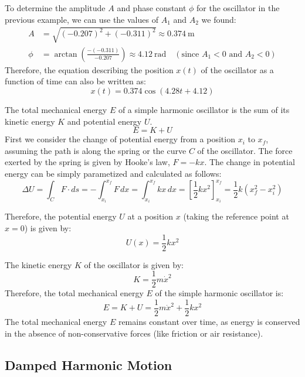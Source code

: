 \documentclass[11pt]{report}
\begin{document}
\begin{example}
    To determine the amplitude \(A\) and phase constant \(\phi\) for the oscillator in the previous example, we can use the values of \(A_1\) and \(A_2\) we found:
    \begin{align*}
        A &= \sqrt{(-0.207)^2 + (-0.311)^2} \approx 0.374\ \mathrm{m} \\
        \phi &= \arctan\!\left(\frac{-(-0.311)}{-0.207}\right) \approx 4.12\ \mathrm{rad} \quad (\text{since } A_1 < 0 \text{ and } A_2 < 0)
    \end{align*}
    Therefore, the equation describing the position \(x(t)\) of the oscillator as a function of time can also be written as:
    $$
    x(t) = 0.374 \cos(4.28 t + 4.12)
    $$
\end{example}

\begin{definition}
    The total mechanical energy \(E\) of a simple harmonic oscillator is the sum of its kinetic energy \(K\) and potential energy \(U\). 
    $$
        E = K + U
    $$
    First we consider the change of potential energy from a position $x_i$ to $x_f$, assuming the path is along the spring or the curve $C$ of the oscillator. The force exerted by the spring is given by Hooke's law, \( F = -kx \). The change in potential energy can be simply parametized and calculated as follows:
    $$
        \Delta U = \int_C F\cdot ds = -\int_{x_i}^{x_f} F\,dx = \int_{x_i}^{x_f} kx\,dx = \left[\frac{1}{2}kx^2\right]_{x_i}^{x_f} = \frac{1}{2}k(x_f^2 - x_i^2)
    $$

    Therefore, the potential energy \(U\) at a position \(x\) (taking the reference point at \(x=0\)) is given by:
    $$
        U(x) = \frac{1}{2}kx^2
    $$

    The kinetic energy \(K\) of the oscillator is given by:
    $$
        K = \frac{1}{2}m\dot{x}^2
    $$
    Therefore, the total mechanical energy \(E\) of the simple harmonic oscillator is:
    \begin{equation}\label{eq:energy_sho}
        E = K + U = \frac{1}{2}m\dot{x}^2 + \frac{1}{2}kx^2
    \end{equation}
    The total mechanical energy \(E\) remains constant over time, as energy is conserved in the absence of non-conservative forces (like friction or air resistance).

\end{definition}

\subsection{Damped Harmonic Motion}
\end{document}
